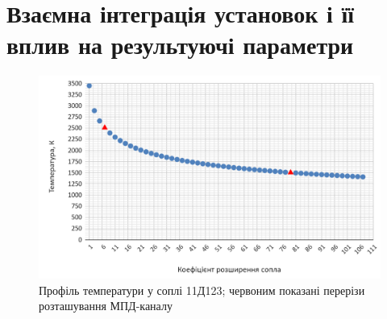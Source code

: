 

\section{Взаємна інтеграція установок і її вплив на результуючі параметри}

\begin{figure}
	\centering
	\includegraphics[width=0.7\textheight, angle=0,origin=c]{chapter_3/11D123_T(epsilon).png}
	\caption{Профіль температури у соплі 11Д123; червоним показані перерізи розташування МПД-каналу}
	\label{fig:11D123_T(epsilon)}
\end{figure}

